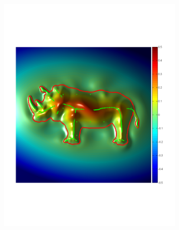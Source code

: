 \documentclass[review]{acmsiggraph}
\begin{document}
\begin{figure}
\begin{subfigure}[b]{0.33\linewidth}
                \includegraphics[width=\textwidth]{images/rhenoceros/2.pdf}
        \end{subfigure}
~
		\begin{subfigure}[b]{0.3\linewidth}
                \centering

\end{subfigure}
\end{figure}
\end{document}
